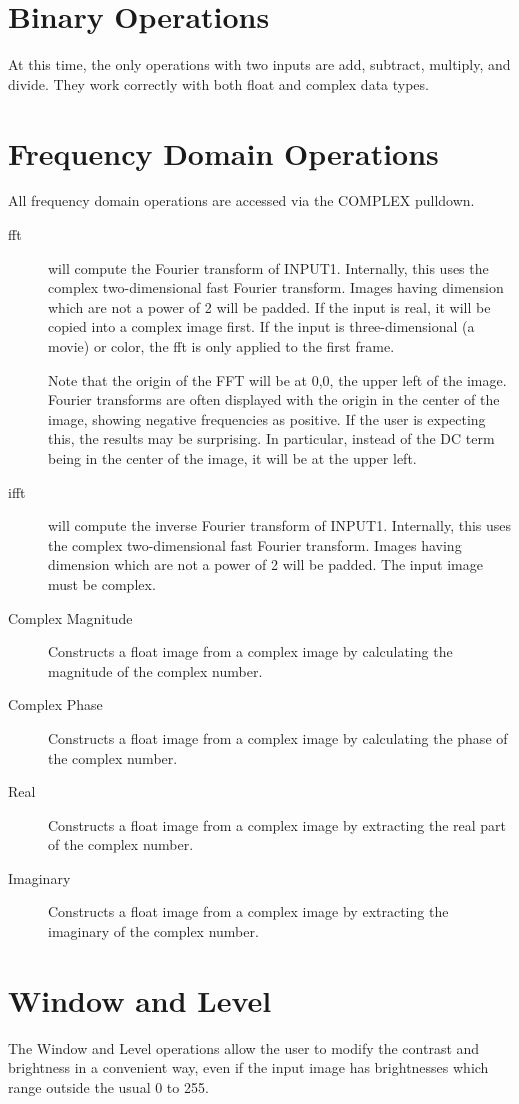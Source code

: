 \documentclass[11pt]{amsart}
\begin{document}
\section{Binary Operations}
At this time, the only operations with two inputs are add, subtract, multiply, and divide. They work correctly with both float and complex data types.
\section{Frequency Domain Operations}
All frequency domain operations are accessed via the COMPLEX pulldown.
\begin{description}
\item[fft] will compute the Fourier transform of INPUT1. Internally, this uses the complex two-dimensional fast Fourier transform. Images having dimension which are not a power of 2 will be padded. If the input is real, it will be copied into a complex image first. If the input is three-dimensional (a movie) or color, the fft is only applied to the first frame.

Note that the origin of the FFT will be at 0,0, the upper left of the image. Fourier transforms are often displayed with the origin in the center of the image, showing negative frequencies as positive. If the user is expecting this, the results may be surprising. In particular, instead of the DC term being in the center of the image, it will be at the upper left.
\item[ifft] will compute the inverse Fourier transform of INPUT1. Internally, this uses the complex two-dimensional fast Fourier transform. Images having dimension which are not a power of 2 will be padded. The input image must be complex. 
\item[Complex Magnitude] Constructs a float image from a complex image by calculating the magnitude of the complex number.
\item[Complex Phase] Constructs a float image from a complex image by calculating the phase of the complex number.
\item[Real] Constructs a float image from a complex image by extracting the real part of the complex number.
\item[Imaginary] Constructs a float image from a complex image by extracting the imaginary of the complex number.
\end{description}
\section{Window and Level}
The Window and Level operations allow the user to modify the contrast and brightness in a convenient way, even if the input image has brightnesses which range outside the usual 0 to 255.
\end{document}
